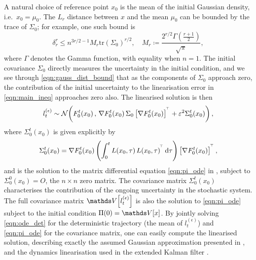 A natural choice of reference point \(x_0\) is the mean of the initial Gaussian density, i.e.\ \(x_0 = \mu_0\).
The \(L_r\) distance between \(x\) and the mean \(\mu_0\) can be bounded by the trace of \(\Sigma_0\); for example, one such bound is
\begin{equation}\label{eqn:gauss_dist_bound}
	\delta_r^{r} \leq n^{3r/2 - 1} M_r \mathrm{tr}\left(\Sigma_0\right)^{r/2}, \quad M_r \coloneqq \frac{2^{r/2}\Gamma\!\left(\frac{r + 1}{2}\right)}{\sqrt{\pi}},
\end{equation}
where \(\Gamma\) denotes the Gamma function, with equality when \(n = 1\).
The initial covariance \(\Sigma_0\) directly measures the uncertainty in the initial condition, and we see through \cref{eqn:gauss_dist_bound} that as the components of \(\Sigma_0\) approach zero, the contribution of the initial uncertainty to the linearisation error in \cref{eqn:main_ineq} approaches zero also.
The linearised solution is then
\[
	l_t^{(\epsilon)} \sim\mathcal{N}\!\left(F_0^t\!\left(x_0\right), \, \nabla F_0^t\!\left(x_0\right) \Sigma_0\left[\nabla F_0^t\!\left(x_0\right)\right]^{^{\!\top}} + \varepsilon^2 \Sigma_0^t\!\left(x_0\right)\right),
\]
where \(\Sigma_0^t\!\left(x_0\right)\) is given explicitly by
\begin{equation}\label{eqn:sigma_def}
	\Sigma_0^t\!\left(x_0\right) = \nabla F_0^t\!\left(x_0\right)\left(\int_0^t{L\!\left(x_0, \tau\right)L\!\left(x_0, \tau\right)^{\T} \dif\tau}\right)\left[\nabla F_0^t\!\left(x_0\right)\right]^{\T},
\end{equation}
and is the solution to the matrix differential equation \cref{eqn:pi_ode} in , subject to \(\Sigma_0^0\!\left(x_0\right) = O\), the \(n \times n\) zero matrix.
The covariance matrix \(\Sigma_0^t\!\left(x_0\right)\) characterises the contribution of the ongoing uncertainty in the stochastic system.
The full covariance matrix \(\var{l_t^{(\epsilon)}}\) is also the solution to \cref{eqn:pi_ode} subject to the initial condition \(\Pi(0) = \var{x}\).
By jointly solving \cref{eqn:ode_det} for the deterministic trajectory (the mean of \(l_t^{(\epsilon)}\)) and \cref{eqn:pi_ode} for the covariance matrix, one can easily compute the linearised solution, describing exactly the assumed Gaussian approximation presented in \citet{SarkkaSolin_2019_AppliedStochasticDifferential}, and the dynamics linearisation used in the extended Kalman filter \citep{Jazwinski_2014_StochasticProcessesFiltering}.


